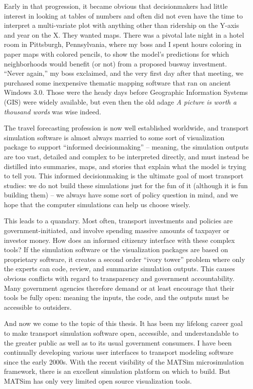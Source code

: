 Early in that progression, it became obvious that decisionmakers had little interest in looking at tables of numbers and often did not even have the time to interpret a multi-variate plot with anything other than ridership on the Y-axis and year on the X. They wanted maps. There was a pivotal late night in a hotel room in Pittsburgh, Pennsylvania, where my boss and I spent hours coloring in paper maps with colored pencils, to show the model's predictions for which neighborhoods would benefit (or not) from a proposed busway investment. ``Never again,'' my boss exclaimed, and the very first day after that meeting, we purchased some inexpensive thematic mapping software that ran on ancient Windows 3.0. Those were the heady days before Geographic Information Systems (GIS) were widely available, but even then the old adage \emph{A picture is worth a thousand words} was wise indeed.

The travel forecasting profession is now well established worldwide, and transport simulation software is almost always married to some sort of visualization package to support ``informed decisionmaking'' -- meaning, the simulation outputs are too vast, detailed and complex to be interpreted directly, and must instead be distilled into summaries, maps, and stories that explain what the model is trying to tell you. This informed decisionmaking is the ultimate goal of most transport studies: we do not build these simulations just for the fun of it (although it is fun building them) -- we always have some sort of policy question in mind, and we hope that the computer simulations can help us choose wisely.

This leads to a quandary. Most often, transport investments and policies are government-initiated, and involve spending massive amounts of taxpayer or investor money. How does an informed citizenry interface with these complex tools? If the simulation software or the visualization packages are based on proprietary software, it creates a second order ``ivory tower'' problem where only the experts can code, review, and summarize simulation outputs. This causes obvious conflicts with regard to transparency and government accountability. Many government agencies therefore demand or at least encourage that their tools be fully open: meaning the inputs, the code, and the outputs must be accessible to outsiders.

And now we come to the topic of this thesis. It has been my lifelong career goal to make transport simulation software open, accessible, and understandable to the greater public as well as to its usual government consumers. I have been continually developing various user interfaces to transport modeling software since the early 2000s. With the recent visibility of the \gls{MATSim} microsimulation framework, there is an excellent simulation platform on which to build. But MATSim has only very limited open source visualization tools.

